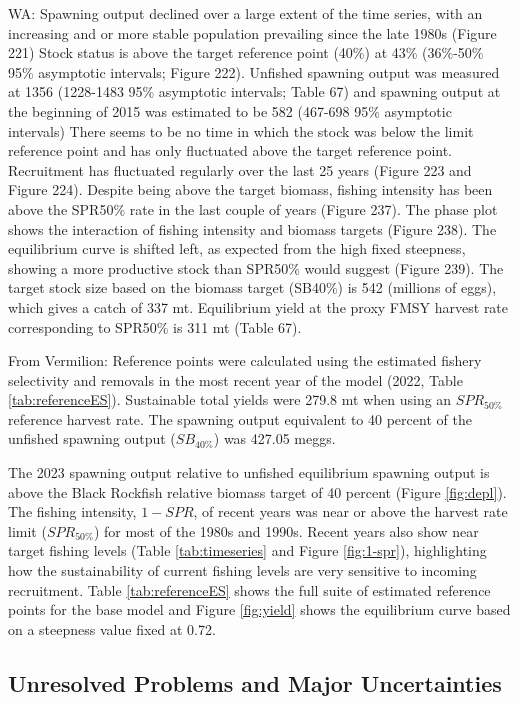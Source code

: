 \documentclass[11pt,
  english,
  letterpaper,
]{article}
\begin{document}
WA: Spawning output declined over a large extent of the time series, with an increasing and or more stable population prevailing since the late 1980s (Figure 221) Stock status is above the target reference point (40\%) at 43\% (36\%-50\% 95\% asymptotic intervals; Figure 222). Unfished spawning output was measured at 1356 (1228-1483 95\% asymptotic intervals; Table 67) and spawning output at the beginning of 2015 was estimated to be 582 (467-698 95\% asymptotic intervals) There seems to be no time in which the stock was below the limit reference point and has only fluctuated above the target reference point. Recruitment has fluctuated regularly over the last 25 years (Figure 223 and Figure 224). Despite being above the target biomass, fishing intensity has been above the SPR50\% rate in the last couple of years (Figure 237). The phase plot shows the interaction of fishing intensity and biomass targets (Figure 238). The equilibrium curve is shifted left, as expected from the high fixed steepness, showing a more productive stock than SPR50\% would suggest (Figure 239). The target stock size based on the biomass target (SB40\%) is 542 (millions of eggs), which gives a catch of 337 mt. Equilibrium yield at the proxy FMSY harvest rate corresponding to SPR50\% is 311 mt (Table 67).

From Vermilion: Reference points were calculated using the estimated fishery selectivity and removals in the most recent year of the model (2022, Table \ref{tab:referenceES}). Sustainable total yields were 279.8 mt when using an \(SPR_{50\%}\) reference harvest rate. The spawning output equivalent to 40 percent of the unfished spawning output (\(SB_{40\%}\)) was 427.05 meggs.

The 2023 spawning output relative to unfished equilibrium spawning output is above the Black Rockfish relative biomass target of 40 percent (Figure \ref{fig:depl}). The fishing intensity, \(1-SPR\), of recent years was near or above the harvest rate limit (\(SPR_{50\%}\)) for most of the 1980s and 1990s. Recent years also show near target fishing levels (Table \ref{tab:timeseries} and Figure \ref{fig:1-spr}), highlighting how the sustainability of current fishing levels are very sensitive to incoming recruitment. Table \ref{tab:referenceES} shows the full suite of estimated reference points for the base model and Figure \ref{fig:yield} shows the equilibrium curve based on a steepness value fixed at 0.72.

\hypertarget{unresolved-problems-and-major-uncertainties-2}{%
\subsection{Unresolved Problems and Major Uncertainties}\label{unresolved-problems-and-major-uncertainties-2}}
\end{document}
